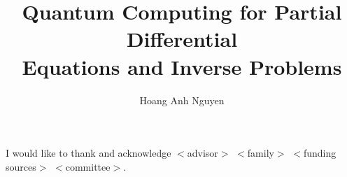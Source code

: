 \documentclass[letterpaper,10pt]{article} %
\title{
    Quantum Computing for Partial Differential\\%
    Equations and Inverse Problems
    }
\author{Hoang Anh Nguyen}        %
\begin{document}

\frontmatter                       %
\maketitle\newpage                 %
\makecopyright{\the\year}\newpage  %
\makesubmittal\newpage             %

\begin{abstract}

\end{abstract} \newpage


\tableofcontents\newpage        %
\listoffigures\newpage          %
\listoftables\newpage           %

\listofsymbols*                         %
\newpage

\listofabbreviations*                  %
\newpage



\begin{acknowledgments}
I would like to thank and acknowledge $<$advisor$>$ $<$family$>$ $<$funding sources$>$ $<$committee$>$.
\end{acknowledgments} \newpage
\end{document}
